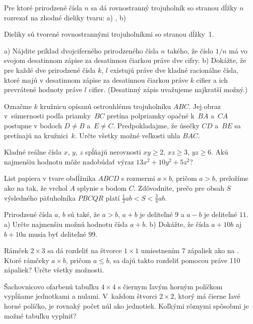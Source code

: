 {%
Pre ktoré prirodzené čísla $n$ sa dá rovnostranný trojuholník so stranou dĺžky $n$ rozrezať na zhodné dieliky tvaru: 
\ite a) ,
\ite b) 

Dieliky sú tvorené rovnostrannými trojuholníkmi so stranou dĺžky~1.
}

{%
\ite a) Nájdite príklad dvojciferného prirodzeného čísla $n$ takého, že číslo $1/n$ má vo svojom desatinnom zápise za desatinnou čiarkou práve dve cifry.
\ite b) Dokážte, že pre každé dve prirodzené čísla $k$, $l$ existujú práve dve kladné racionálne čísla, ktoré majú v desatinnom zápise za desatinnou čiarkou práve $k$ cifier a ich prevrátené hodnoty práve $l$ cifier.
\endgraf
(Desatinný zápis uvažujeme najkratší možný.)
}

{%
Označme $k$ kružnicu opísanú ostrouhlému trojuholníku $ABC$. Jej obraz v~súmernosti podľa priamky~$BC$ pretína polpriamky opačné k~$BA$ a~$CA$ postupne v bodoch $D\ne B$ a~$E\ne C$. Predpokladajme, že úsečky $CD$ a~$BE$ sa pretínajú na kružnici~$k$. Určte všetky možné veľkosti uhla $BAC$.
}

{%
Kladné reálne čísla $x$, $y$, $z$ spĺňajú nerovnosti $xy \ge 2$, $xz \ge 3$, $yz \ge 6$. Akú najmenšiu hodnotu môže nadobúdať výraz $13x^2+10y^2+5z^2$?
}

{%
List papiera v tvare obdĺžnika $ABCD$ s rozmermi $a\times b$, pričom $a>b$,
preložíme ako na \obr{} tak, že vrchol $A$ splynie s bodom $C$.
Zdôvodnite, prečo pre obsah $S$ výsledného päťuholníka $PBCQR$ platí $\frac12 ab < S < \frac34 ab$.
%
}

{%
Prirodzené čísla $a$, $b$ sú také, že $a>b$, $a+b$ je deliteľné $9$ a $a-b$ je deliteľné $11$.
\ite a) Určte najmenšiu možnú hodnotu čísla $a+b$.
\ite b) Dokážte, že čísla $a+10b$ aj $b+10a$ musia byť deliteľné $99$.
}

{%
Rámček $2\times 3$ sa dá rozdeliť na štvorce $1\times1$ umiestnením $7$ zápaliek ako na \obr{}.
Ktoré rámčeky $a\times b$, pričom $a\le b$, sa dajú takto rozdeliť pomocou práve 110 zápaliek? Určte všetky možnosti.
%
}

{%
Šachovnicovo ofarbenú tabuľku $4\times 4$ s čiernym ľavým horným políčkom vypĺňame jednotkami a nulami. V~každom štvorci $2\times 2$, ktorý má čierne ľavé horné políčko, je rovnaký počet núl ako jednotiek. Koľkými rôznymi spôsobmi je možné tabuľku vyplniť?
}

